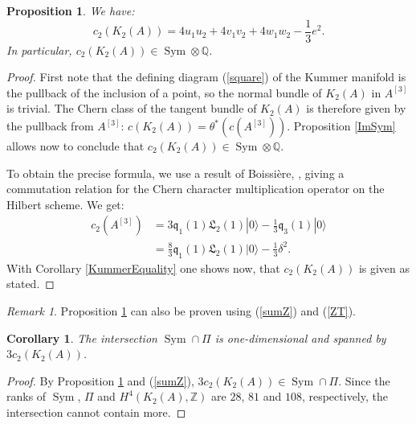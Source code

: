 \documentclass{alggeom}
\DeclareMathOperator{\Sym}{Sym}
\newcommand{\hilb}[1]{^{[#1]}}
\newcommand{\vac}{|0\rangle}
\newcommand{\q}{\mathfrak{q}}
\newcommand{\kum}[2]{K_{ #2 }( #1 )}
\newcommand{\X}{\kum{A}{2}}
\newcommand{\cc}{c_2(\X)}
\newcommand{\Q}{\mathbb{Q}}
\newcommand{\Z}{\mathbb{Z}}
\theoremstyle{plain}
\newtheorem{proposition}[theorem]{Proposition}
\newtheorem{corollary}[theorem]{Corollary}
\theoremstyle{definition}
\theoremstyle{remark}
\newtheorem{rmk}[theorem]{Remark}
\begin{document}
\begin{proposition} \label{ChernSym}
We have:
\begin{equation}
\cc= 4 u_1u_2 + 4v_1v_2 + 4 w_1 w_2 - \frac{1}{3} e^2. 
\end{equation}
In particular, $\cc\in \Sym \otimes\Q $.
\end{proposition}
\begin{proof}
First note that the defining diagram (\ref{square}) of the Kummer manifold is the pullback of the inclusion of a point, so the normal bundle of $\X$ in $A\hilb{3}$ is trivial. The Chern class of the tangent bundle of $\X$ is therefore given by the pullback from $A\hilb{3}$: $c(\X) = \theta^*\left(c(A\hilb{3})\right)$. Proposition \ref{ImSym} allows now to conclude that $\cc\in \Sym \otimes \Q$.

To obtain the precise formula, we use a result of Boissi\`ere, \cite[Lemma 3.12]{Boissiere}, giving a commutation relation for the Chern character multiplication operator on the Hilbert scheme. We get:
\begin{align*}
c_2(A\hilb{3}) & = 3\q_1(1)\mathfrak L_2(1)\vac - \frac{1}{3} \q_3(1)\vac \\
 & =\frac{8}{3}\q_1(1)\mathfrak L_2(1)\vac - \frac{1}{3} \delta^2 .
\end{align*}
With Corollary \ref{KummerEquality} one shows now, that $\cc$ is given as stated.
\end{proof}
\begin{rmk}
Proposition \ref{ChernSym} can also be proven using (\ref{sumZ}) and (\ref{ZT}).
\end{rmk}


\begin{corollary}\label{Pi'}
The intersection $\Sym\cap \Pi$ is one-dimensional and spanned by $3\cc$. 
\end{corollary}
\begin{proof}
By Proposition \ref{ChernSym} and (\ref{sumZ}), $3\cc\in \Sym\cap \Pi$. Since the ranks of $\Sym$, $\Pi$ and $H^4(\X,\Z)$ are $28$, $81$ and $108$, respectively, the intersection cannot contain more.
\end{proof}
\end{document}
